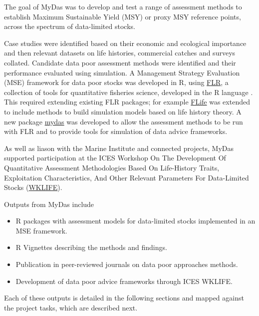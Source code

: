 
The goal of MyDas was to develop and test a range of assessment methods to establish Maximum Sustainable Yield (MSY) or proxy MSY reference points, across the spectrum of data-limited stocks. 

Case studies were identified based on their economic and ecological importance and then relevant datasets on life histories, commercial catches and surveys collated. Candidate data poor assessment methods were identified and their performance evaluated using simulation. A Management Strategy Evaluation (MSE) framework for data poor stocks was developed in R, using \href{http://www.flr-project.org/}{FLR}, a collection of tools for quantitative fisheries science, developed in the R language \citep{kell2007flr}. This required extending existing FLR packages; for example \href{https://github.com/flr/flife}{FLife} was extended to include methods to build simulation models based on life history theory. A new package \href{https://github.com/flr/mydas/wiki}{mydas} was developed to allow the assessment methods to be run with FLR and to provide tools for simulation of data advice frameworks.
 

As well as liason with the Marine Institute and connected projects, MyDas supported participation at the ICES Workshop On The Development Of Quantitative Assessment Methodologies Based On Life-History Traits, Exploitation Characteristics, And Other Relevant Parameters For Data-Limited Stocks (\href{https://www.ices.dk/community/groups/Pages/WKLIFEIX.aspx}{WKLIFE}).



Outputs from MyDas include

\begin{itemize}[noitemsep,topsep=0pt,parsep=0pt,partopsep=0pt]
 \item R packages with assessment models for data-limited stocks implemented in an MSE framework. 
 \item R Vignettes describing the methods and findings.
 \item Publication in peer-reviewed journals on data poor approaches methods.
 \item Development of data poor advice frameworks through ICES WKLIFE.
\end{itemize}

Each of these outputs is detailed in the following sections and mapped against the project tasks, which are described next.
